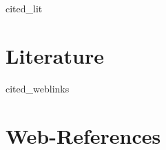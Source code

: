 \thispagestyle{empty}




\begin{btSect}[plain]{cited_lit}
\section*{Literature}
\setlength{\bibhang}{2em}
\btPrintCited
\end{btSect}

\nocite{*} 
\begin{btSect}[plain]{cited_weblinks}
\section*{Web-References}
\setlength{\bibhang}{2em}
\btPrintCited
\end{btSect}
